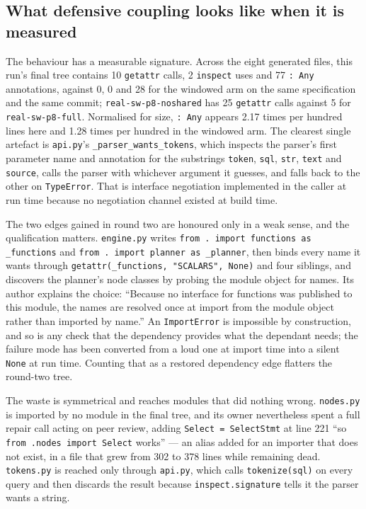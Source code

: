 \documentclass[11pt]{article}
\begin{document}
\subsection{What defensive coupling looks like when it is measured}

The behaviour has a measurable signature. Across the eight generated files, this run's final tree
contains 10 \texttt{getattr} calls, 2 \texttt{inspect} uses and 77 \texttt{: Any} annotations,
against 0, 0 and 28 for the windowed arm on the same specification and the same commit;
\texttt{real-sw-p8-noshared} has 25 \texttt{getattr} calls against 5 for
\texttt{real-sw-p8-full}. Normalised for size, \texttt{: Any} appears 2.17 times per hundred
lines here and 1.28 times per hundred in the windowed arm. The clearest single artefact is
\texttt{api.py}'s \texttt{\_parser\_wants\_tokens}, which inspects the parser's first parameter
name and annotation for the substrings \texttt{token}, \texttt{sql}, \texttt{str}, \texttt{text}
and \texttt{source}, calls the parser with whichever argument it guesses, and falls back to the
other on \texttt{TypeError}. That is interface negotiation implemented in the caller at run time
because no negotiation channel existed at build time.

The two edges gained in round two are honoured only in a weak sense, and the qualification
matters. \texttt{engine.py} writes \texttt{from . import functions as \_functions} and
\texttt{from . import planner as \_planner}, then binds every name it wants through
\texttt{getattr(\_functions, "SCALARS", None)} and four siblings, and discovers the planner's node
classes by probing the module object for names. Its author explains the choice: ``Because no
interface for functions was published to this module, the names are resolved once at import from
the module object rather than imported by name.'' An \texttt{ImportError} is impossible by
construction, and so is any check that the dependency provides what the dependant needs; the
failure mode has been converted from a loud one at import time into a silent \texttt{None} at run
time. Counting that as a restored dependency edge flatters the round-two tree.

The waste is symmetrical and reaches modules that did nothing wrong. \texttt{nodes.py} is
imported by no module in the final tree, and its owner nevertheless spent a full repair call
acting on peer review, adding \texttt{Select = SelectStmt} at line 221 ``so \texttt{from .nodes
import Select} works'' --- an alias added for an importer that does not exist, in a file that
grew from 302 to 378 lines while remaining dead. \texttt{tokens.py} is reached only through
\texttt{api.py}, which calls \texttt{tokenize(sql)} on every query and then discards the result
because \texttt{inspect.signature} tells it the parser wants a string.
\end{document}
